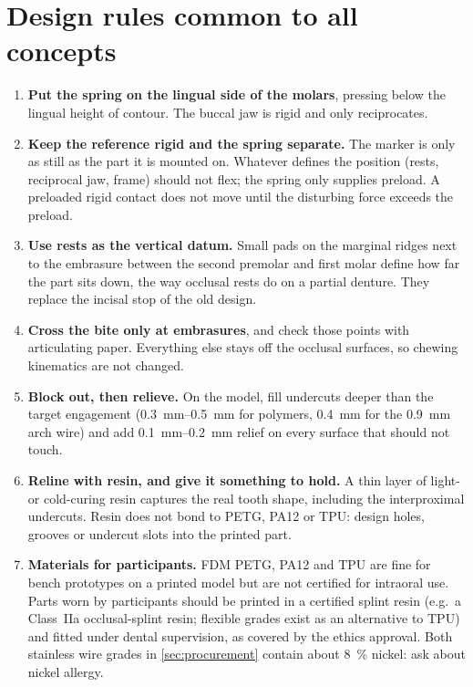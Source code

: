
\section{Design rules common to all concepts}\label{sec:principles}
\begin{enumerate}[label=\textbf{R\arabic*}]
\item \textbf{Put the spring on the lingual side of the molars}, pressing below the lingual height
of contour. The buccal jaw is rigid and only reciprocates.
\item \textbf{Keep the reference rigid and the spring separate.} The marker is only as still as
the part it is mounted on. Whatever defines the position (rests, reciprocal jaw, frame) should
not flex; the spring only supplies preload. A preloaded rigid contact does not move until the
disturbing force exceeds the preload.
\item \textbf{Use rests as the vertical datum.} Small pads on the marginal ridges next to the
embrasure between the second premolar and first molar define how far the part sits down, the way
occlusal rests do on a partial denture. They replace the incisal stop of the old design.
\item \textbf{Cross the bite only at embrasures}, and check those points with articulating paper.
Everything else stays off the occlusal surfaces, so chewing kinematics are not changed.
\item \textbf{Block out, then relieve.} On the model, fill undercuts deeper than the target
engagement (\SIrange{0.3}{0.5}{\milli\metre} for polymers, \SI{0.4}{\milli\metre} for the
\SI{0.9}{\milli\metre} arch wire) and add \SIrange{0.1}{0.2}{\milli\metre} relief on every
surface that should not touch.
\item \textbf{Reline with resin, and give it something to hold.} A thin layer of light- or
cold-curing resin captures the real tooth shape, including the interproximal undercuts. Resin does
not bond to PETG, PA12 or TPU: design holes, grooves or undercut slots into the printed part.
\item \textbf{Materials for participants.} FDM PETG, PA12 and TPU are fine for bench prototypes
on a printed model but are not certified for intraoral use. Parts worn by participants should be
printed in a certified splint resin (e.g.\ a Class~IIa occlusal-splint resin; flexible grades
exist as an alternative to TPU) and fitted under dental supervision, as covered by the ethics
approval. Both stainless wire grades in \cref{sec:procurement} contain about \SI{8}{\percent}
nickel: ask about nickel allergy.
\end{enumerate}
